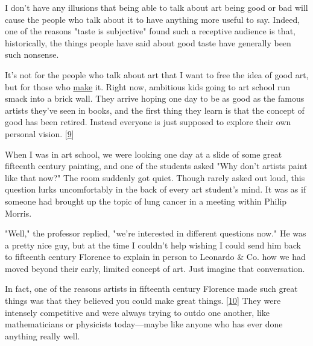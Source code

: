 I don't have any illusions that being able to
                  talk about art being good or bad will cause the people who
                  talk about it to have anything more useful to say. Indeed, one
                  of the reasons "taste is subjective" found such a receptive
                  audience is that, historically, the things people have said
                  about good taste have generally been such nonsense.

It's
                  not for the people who talk about art that I want to free the
                  idea of good art, but for those who
                  \href{http://www.paulgraham.com/taste.html}{make} it. Right now, ambitious kids
                  going to art school run smack into a brick wall. They arrive
                  hoping one day to be as good as the famous artists they've
                  seen in books, and the first thing they learn is that the
                  concept of good has been retired. Instead everyone is just
                  supposed to explore their own personal vision.
                  [\href{\#f9n}{9}]

When I was in art school, we were looking one day
                  at a slide of some great fifteenth century painting, and one
                  of the students asked "Why don't artists paint like that now?"
                  The room suddenly got quiet. Though rarely asked out loud,
                  this question lurks uncomfortably in the back of every art
                  student's mind. It was as if someone had brought up the topic
                  of lung cancer in a meeting within Philip Morris.

"Well,"
                  the professor replied, "we're interested in different
                  questions now." He was a pretty nice guy, but at the time I
                  couldn't help wishing I could send him back to fifteenth
                  century Florence to explain in person to Leonardo \& Co. how we
                  had moved beyond their early, limited concept of art. Just
                  imagine that conversation.

In fact, one of the
                  reasons artists in fifteenth century Florence made such great
                  things was that they believed you could make great things.
                  [\href{\#f10n}{10}]
                  They were intensely competitive and were always trying to
                  outdo one another, like mathematicians or physicists
                  today---maybe like anyone who has ever done anything
                  really well.

